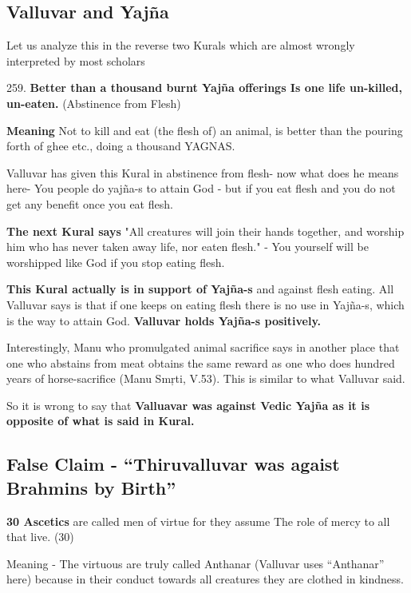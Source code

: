 \subsection*{Valluvar and Yajña}

Let us analyze this in the reverse two Kurals which are almost wrongly interpreted by most scholars

259. \textbf{Better than a thousand burnt Yajña offerings Is one life un-killed, un-eaten.} (Abstinence from Flesh)

\textbf{Meaning} Not to kill and eat (the flesh of) an animal, is better than the pouring forth of ghee etc., doing a thousand YAGNAS.

Valluvar has given this Kural in abstinence from flesh- now what does he means here- You people do yajña-s to attain God - but if you eat flesh and you do not get any benefit once you eat flesh.

\textbf{The next Kural says} "All creatures will join their hands together, and worship him who has never taken away life, nor eaten flesh." - You yourself will be worshipped like God if you stop eating flesh.

\textbf{This Kural actually is in support of Yajña-s} and against flesh eating. All Valluvar says is that if one keeps on eating flesh there is no use in Yajña-s, which is the way to attain God. \textbf{Valluvar holds Yajña-s positively.}

Interestingly, Manu who promulgated animal sacrifice says in another place that one who abstains from meat obtains the same reward as one who does hundred years of horse-sacrifice (Manu Smŗti, V.53). This is similar to what Valluvar said.

So it is wrong to say that \textbf{Valluavar was against Vedic Yajña as it is opposite of what is said in Kural.}


\subsection*{False Claim - “Thiruvalluvar was agaist Brahmins by Birth”}

\textbf{30 Ascetics} are called men of virtue for they assume The role of mercy to all that live. (30)

Meaning - The virtuous are truly called Anthanar (Valluvar uses “Anthanar” here) because in their conduct towards all creatures they are clothed in kindness.

